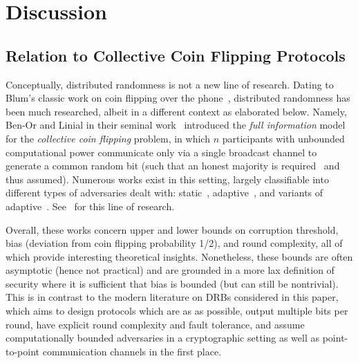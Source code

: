
\section{Discussion}
\label{section:discussions}


\subsection{Relation to Collective Coin Flipping Protocols}
Conceptually, distributed randomness is not a new line of research.
Dating to Blum's classic work on coin flipping over the phone~\cite{blum1983coin}, distributed randomness has been much researched, albeit in a different context as elaborated below.
Namely, Ben-Or and Linial in their seminal work~\cite{ben1985collective,ben1989collective} introduced the \textit{full information} model for the \textit{collective coin flipping} problem, in which $n$ participants with unbounded computational power communicate only via a single broadcast channel to generate a common random bit (such that an honest majority is required~\cite{saks1989robust,boppana2000perfect} and thus assumed).
Numerous works exist in this setting, largely classifiable into different types of adversaries dealt with: static~\cite{ben1989collective,ajtai1993influence,kahn1989influence,saks1989robust,alon1993coin,boppana2000perfect,feige1999noncryptographic,russell1999lower}, adaptive~\cite{ben1989collective,lichtenstein1989some,goldwasser2015adaptively,dodis2000impossibility,kalai2021lower,haitner2020tight}, and variants of adaptive~\cite{mahloujifar2019can,etesami2020computational,cleve1993martingales,aspnes1998lower,goldwasser2015adaptively}.
See~\cite{kalai2021lower,haitner2020tight} for this line of research.

Overall, these works concern upper and lower bounds on corruption threshold, bias (deviation from coin flipping probability 1/2), and round complexity, all of which provide interesting theoretical insights.
Nonetheless, these bounds are often asymptotic (hence not practical) and are grounded in a more lax definition of security where it is sufficient that bias is bounded (but can still be nontrivial).
This is in contrast to the modern literature on DRBs considered in this paper, which aims to design protocols which are as \drbsecure as possible, output multiple bits per round, have explicit round complexity and fault tolerance, and assume computationally bounded adversaries in a cryptographic setting as well as point-to-point communication channels in the first place.

